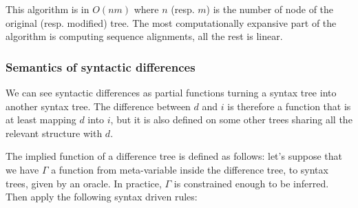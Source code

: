 \documentclass[a4paper,10pt]{article}
\begin{document}
This algorithm is in $O(nm)$ where $n$ (resp. $m$) is the number of node of the original (resp. modified) tree. The most computationally expansive part of the algorithm is computing sequence alignments, all the rest is linear.

\subsubsection{Semantics of syntactic differences}
We can see syntactic differences as partial functions turning a syntax tree into another syntax tree.
The difference between $d$ and $i$ is therefore a function that is at least mapping $d$ into $i$, but it is also defined on some other trees sharing all the relevant structure with $d$.

The implied function of a difference tree is defined as follows: let's suppose that we have $\Gamma$ a function from meta-variable inside the difference tree, to syntax trees, given by an oracle. In practice, $\Gamma$ is constrained enough to be inferred. Then apply the following syntax driven rules:
\end{document}
